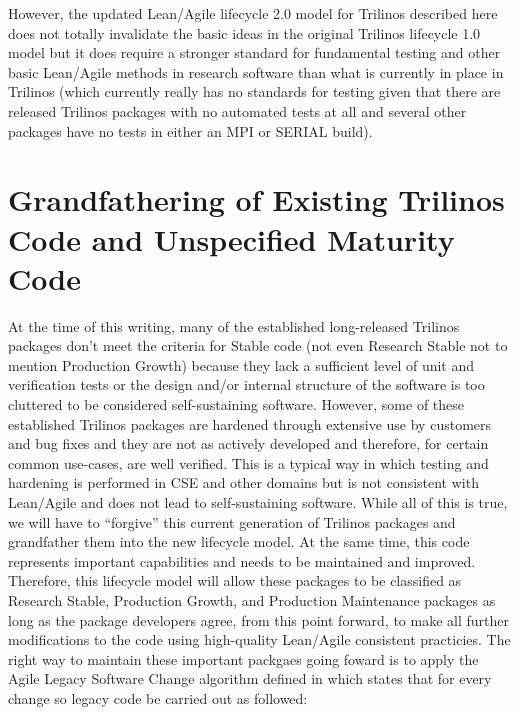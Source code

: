 \documentclass[11pt]{SANDreport}
\begin{document}
However, the updated Lean/Agile lifecycle 2.0 model for Trilinos
described here does not totally invalidate the basic ideas in the
original Trilinos lifecycle 1.0 model but it does require a stronger
standard for fundamental testing and other basic Lean/Agile methods in
research software than what is currently in place in Trilinos (which
currently really has no standards for testing given that there are
released Trilinos packages with no automated tests at all and several
other packages have no tests in either an MPI or SERIAL build).


%
{}\section{Grandfathering of Existing Trilinos Code and Unspecified
Maturity Code}
\label{sec:grandfathering}
%

At the time of this writing, many of the established long-released
Trilinos packages don't meet the criteria for Stable code (not even
Research Stable not to mention Production Growth) because they lack a
sufficient level of unit and verification tests or the design and/or
internal structure of the software is too cluttered to be considered
self-sustaining software.  However, some of these established Trilinos
packages are hardened through extensive use by customers and bug fixes
and they are not as actively developed and therefore, for certain
common use-cases, are well verified.  This is a typical way in which
testing and hardening is performed in CSE and other domains but is not
consistent with Lean/Agile and does not lead to self-sustaining
software.  While all of this is true, we will have to ``forgive'' this
current generation of Trilinos packages and grandfather them into the
new lifecycle model.  At the same time, this code represents important
capabilities and needs to be maintained and improved.  Therefore, this
lifecycle model will allow these packages to be classified as Research
Stable, Production Growth, and Production Maintenance packages as long
as the package developers agree, from this point forward, to make all
further modifications to the code using high-quality Lean/Agile
consistent practicies.  The right way to maintain these important
packgaes going foward is to apply the Agile Legacy Software Change
algorithm defined in {}\cite{WorkingEffectivelyWithLegacyCode05} which
states that for every change so legacy code be carried out as
followed:
\end{document}
